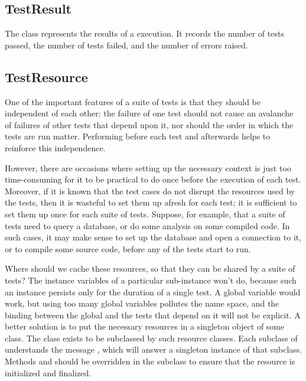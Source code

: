 \documentclass[a4paper,10pt,twoside]{book}
\begin{document}
\subsection{TestResult}

The class  represents the results of a
 execution.  It records the number of tests passed,
the number of tests failed, and the number of errors raised.

\subsection{TestResource}

One of the important  features of a suite of tests is that they should be independent of each other: the failure of one test should not cause an avalanche of failures of other tests that depend upon it, nor should the order in which the tests are run matter.
Performing  before each test and  afterwards helps to reinforce this independence. 

However, there are occasions where setting up the necessary context is just too time-consuming for it to be practical to do once before the execution of each test.
Moreover, if it is known that the test cases do not disrupt the resources used by the tests, then it is wasteful to set them up afresh for each test; it is sufficient to set them up once for each suite of tests.
Suppose, for example, that a suite of tests need to query a database, or do some analysis on some compiled code.
In such cases, it may make sense to set up the database and open a connection to it, or to compile some source code, before any of the tests start to run.

Where should we cache these resources, so that they can be shared by a suite of tests?
The instance variables of a particular  sub-instance won't do, because such an instance persists only for the duration of a single test.
A global variable would work, but using too many global variables pollutes the name space, and the binding between the global and the tests that depend on it will not be explicit.
A better solution is to put the necessary resources in a singleton object of some class.
The class  exists to be subclassed by such resource classes.
Each subclass of  understands the message  , which will answer a singleton instance of that subclass.
Methods  and  should be overridden in the subclass to ensure that the resource is initialized and finalized.
\end{document}
